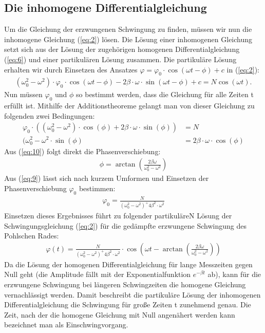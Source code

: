 \subsection{Die inhomogene Differentialgleichung}
\label{inh.DGL}
Um die Gleichung der erzwungenen Schwingung zu finden, müssen wir nun die inhomogene Gleichung (\ref{eq:2}) lösen. 
Die Lösung einer inhomogenen Gleichung setzt sich aus der Lösung der zugehörigen homogenen 
Differentialgleichung (\ref{eq:6}) und einer partikulären Lösung zusammen. 
Die partikuläre Lösung erhalten wir durch Einsetzen des Ansatzes $\varphi=\varphi_0\cdot \cos(\omega t-\phi)+c$ in 
(\ref{eq:2}):
\begin{align}
\label{eq:8}
(\omega_0^2-\omega^2)\cdot\varphi_0\cdot\cos(\omega t-\phi)-2\beta\cdot\omega\cdot\sin(\omega t-\phi)+c=N\cos(\omega t). 
\end{align}
Nun müssen $\varphi_0$ und $\phi$ so bestimmt werden, dass die Gleichung für alle Zeiten t erfüllt ist.
Mithilfe der Additionstheoreme gelangt man von dieser Gleichung zu folgenden zwei Bedingungen:
\begin{align}
\label{eq:9}
\varphi_0\cdot\left((\omega_0^2-\omega^2)\cdot\cos(\phi)+2\beta\cdot\omega\cdot\sin(\phi)\right) &= N \\
\label{eq:10}
(\omega_0^2-\omega^2\cdot\sin(\phi) &= 2\beta\cdot\omega\cdot\cos(\phi)
\end{align}
Aus (\ref{eq:10}) folgt direkt die Phasenverschiebung:
\begin{align}
\label{eq:11}
\phi=\arctan\left(\frac{2\beta\omega}{\omega_0^2-\omega^2}\right)
\end{align}
Aus (\ref{eq:9}) lässt sich nach kurzem Umformen und Einsetzen der Phasenverschiebung $\varphi_0$ bestimmen:
\begin{align}
\label{eq:12}
\varphi_0=\frac{N}{(\omega_0^2-\omega^2)^+4\beta^2\cdot\omega^2}
\end{align}
Einsetzen dieses Ergebnisses führt zu folgender partikuläreN Lösung der Schwingungsgleichung (\ref{eq:2}) für die gedämpfte erzwungene Schwingung 
des Pohlschen Rades:
\begin{align}
\label{eq:13}
\varphi(t)=\frac{N}{(\omega_0^2-\omega^2)^+4\beta^2\cdot\omega^2}\cdot\cos\left(\omega t-\arctan\left(\frac{2\beta\omega}{\omega_0^2-\omega^2}\right)\right)
\end{align}
Da die Lösung der homogenen Differentialgleichung für lange Messzeiten gegen Null geht (die Amplitude fällt mit der Exponentialfunktion $e^{-\beta t}$ 
ab), kann für die erzwungene Schwingung bei längeren Schwingzeiten die homogene Gleichung vernachlässigt werden.
Damit beschreibt die partikuläre Lösung der inhomogenen Differentialgleichung die Schwingung für große Zeiten t zunehmend genau. Die Zeit, nach der die homogene Gleichung mit Null angenähert werden kann bezeichnet man als Einschwingvorgang.
\newpage
